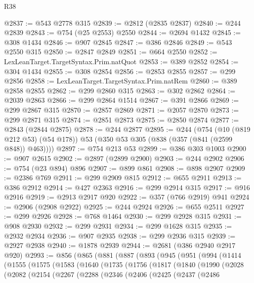 \begin{lexlean}{R38}
\begin{coremodule}
@2837 := @543 @2778 @315
@2839 := @2812 (@2835 @2837)
@2840 := @244 @2839
@2843 := @754 (@25 @2553) @2550
@2844 := @2694 @1432
@2845 := @308 @1434
@2846 := @907 @2845
@2847 := @386 @2846
@2849 := @543 @2550 @315
@2850 := @2847 @2849
@2851 := @664 @2550
@2852 := LexLeanTarget.TargetSyntax.Prim.natQuot
@2853 := @389 @2852
@2854 := @304 @1434
@2855 := @308 @2854
@2856 := @2853 @2855
@2857 := @299 @2856
@2858 := LexLeanTarget.TargetSyntax.Prim.natRem
@2860 := @389 @2858 @2855
@2862 := @299 @2860 @315
@2863 := @302 @2862
@2864 := @2039 @2863
@2866 := @299 @2864 @1514
@2867 := @391 @2866
@2869 := @299 @2867 @315
@2870 := @2857 @2869
@2871 := @2057 @2870
@2873 := @299 @2871 @315
@2874 := @2851 @2873
@2875 := @2850 @2874
@2877 := @2843 (@2844 @2875)
@2878 := @244 @2877
@2895 := @244
    (@754
      (@10 (@819 @212 @53) (@54 @178))
      @53
      (@350 @53 @305 (@838 (@357 (@841 (@2599 @848)) @463))))
@2897 := @754 @213 @53
@2899 := @386 @303 @1003
@2900 := @907 @2615
@2902 := @2897 (@2899 @2900)
@2903 := @244 @2902
@2906 := @754 (@23 @894) @896
@2907 := @899 @861
@2908 := @898 @2907
@2909 := @2386 @769
@2911 := @299 @2909 @815
@2912 := @655 @2911
@2913 := @386 @2912
@2914 := @427 @2363
@2916 := @299 @2914 @315
@2917 := @916 @2916
@2919 := @2913 @2917 @920
@2922 := @357 (@766 @2919) @941
@2924 := @2906 (@2908 @2922)
@2925 := @244 @2924
@2926 := @655 @2511
@2927 := @299 @2926
@2928 := @768 @1464
@2930 := @299 @2928 @315
@2931 := @908 @2930
@2932 := @299 @2931
@2934 := @299 @1628 @315
@2935 := @2932 @2934
@2936 := @907 @2935
@2938 := @299 @2936 @315
@2939 := @2927 @2938
@2940 := @1878 @2939
@2944 := @2681 (@386 @2940 @2917 @920)
@2993 := @856
    (@865
      (@881
        (@887
          (@893
            (@945
              (@951
                (@994
                  (@1414
                    (@1555
                      (@1575
                        (@1583
                          (@1640
                            (@1735
                              (@1756
                                (@1817
                                  (@1840
                                    (@1990
                                      (@2028
                                        (@2082
                                          (@2154
                                            (@2267
                                              (@2288
                                                (@2346
                                                  (@2406
                                                    (@2425
                                                      (@2437
                                                        (@2486

\end{coremodule}
\end{lexlean}
